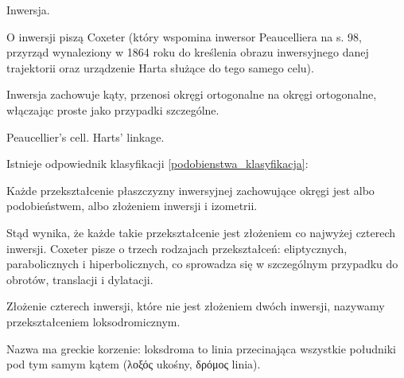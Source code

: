 Inwersja.

O inwersji piszą Coxeter \cite[s. 93-101, 107-112]{coxeter_1967} (który wspomina inwersor Peaucelliera na s. 98, przyrząd wynaleziony w 1864 roku do kreślenia obrazu inwersyjnego danej trajektorii oraz urządzenie Harta służące do tego samego celu).

Inwersja zachowuje kąty, przenosi okręgi ortogonalne na okręgi ortogonalne, włączając proste jako przypadki szczególne.

Peaucellier's cell.
Harts' linkage.


Istnieje odpowiednik klasyfikacji \ref{podobienstwa_klasyfikacja}:

\begin{proposition}
    Każde przekształcenie płaszczyzny inwersyjnej zachowujące okręgi jest albo podobieństwem, albo złożeniem inwersji i izometrii.
\end{proposition}

Stąd wynika, że każde takie przekształcenie jest złożeniem co najwyżej czterech inwersji.
Coxeter \cite[s. 108]{coxeter_1967} pisze o trzech rodzajach przekształceń: eliptycznych, parabolicznych i hiperbolicznych, co sprowadza się w szczególnym przypadku do obrotów, translacji i dylatacji.

\begin{proposition}
    Złożenie czterech inwersji, które nie jest złożeniem dwóch inwersji, nazywamy przekształceniem loksodromicznym.
\end{proposition}

Nazwa ma greckie korzenie: loksdroma to linia przecinająca wszystkie południki pod tym samym kątem (λοξός ukośny, δρόμος linia).

%